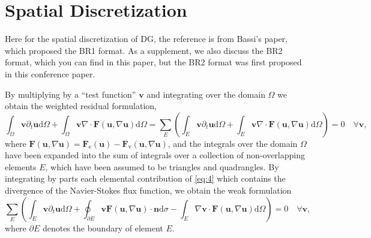 \documentclass{develop-note}
\begin{document}
\section{Spatial Discretization}

Here for the spatial discretization of DG, the reference is from Bassi's paper\cite{bassiHighOrderAccurateDiscontinuous1997a}, which proposed the BR1 format. As a supplement, we also discuss the BR2 format, which you can find in this paper\cite{bassiDiscontinuousGalerkinSolution2005}, but the BR2 format was first proposed in this conference paper\cite{bassiHighOrderAccurate1997}.

By multiplying by a ``test function'' $\mathbf{v}$ and integrating over the domain $\Omega$ we obtain the weighted residual formulation,
\begin{equation}
  \label{eq:4}
  \int_{\Omega}\mathbf{v}\partial_{t}\mathbf{u}\mathrm{d}\Omega+\int_{\Omega}\mathbf{v}\nabla\cdot\mathbf{F}(\mathbf{u},\nabla\mathbf{u})\mathrm{d}\Omega=\sum_{E}\left(\int_{E}\mathbf{v}\partial_{t}\mathbf{u}\mathrm{d}\Omega+\int_{E}\mathbf{v}\nabla\cdot\mathbf{F}(\mathbf{u},\nabla\mathbf{u})\mathrm{d}\Omega\right)=0\quad\forall\mathbf{v},
\end{equation}
where $\mathbf{F}(\mathbf{u},\nabla\mathbf{u})=\mathbf{F}_{\mathrm{e}}(\mathbf{u})-\mathbf{F}_{\mathrm{v}}(\mathbf{u},\nabla\mathbf{u})$, and the integrals over the domain $\Omega$ have been expanded into the sum of integrals over a collection of non-overlapping elements ${E}$, which have been assumed to be triangles and quadrangles. By integrating by parts each elemental contribution of \autoref{eq:4} which contains the divergence of the Navier-Stokes flux function, we obtain the weak formulation
\begin{equation}
  \label{eq:5}
  \sum_{E}\left(\int_{E}\mathbf{v}\partial_{t}\mathbf{u}\mathrm{d}\Omega+\oint_{\partial E}\mathbf{v}\mathbf{F}(\mathbf{u},\nabla\mathbf{u})\cdot\mathbf{n}\mathrm{d}\sigma-\int_{E}\nabla\mathbf{v}\cdot\mathbf{F}(\mathbf{u},\nabla\mathbf{u})\mathrm{d}\Omega\right)=0\quad\forall\mathbf{v},
\end{equation}
where $\partial E$ denotes the boundary of element $E$.
\end{document}
